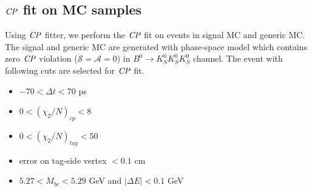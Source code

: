 \subsection{$\it{CP}$ fit on MC samples}
Using $\it{CP}$ fitter, we perform the $\it{CP}$ fit on events in signal MC and generic MC.
The signal and generic MC are generated with phase-space model which contains zero $\it{CP}$ violation ($\mathcal{S}=\mathcal{A}=0$) in $B^0 \to K_S^0  K_S^0  K_S^0$ channel. 
The event with following cuts are selected for $\it{CP}$ fit. 
\begin{itemize}
	\item $-70 < \Delta t < 70$ ps
	\item $0 < (\chi_2/N)_{cp} < 8 $
	\item $0 < (\chi_2/N)_{tag} < 50 $
	\item error on tag-side vertex $< 0.1 $ cm
	\item $5.27 < M_{bc} < 5.29$ GeV and $|\Delta E| < 0.1$ GeV
\end{itemize}

